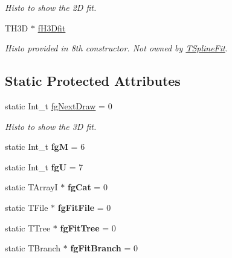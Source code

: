 \begin{DoxyCompactItemize}
\begin{DoxyCompactList}\small\item\em Histo to show the 2\-D fit. \end{DoxyCompactList}\item 
\hypertarget{classTSplineFit_a2c1b604dda9cf4250aa0e285be32dc08}{T\-H3\-D $\ast$ \hyperlink{classTSplineFit_a2c1b604dda9cf4250aa0e285be32dc08}{f\-H3\-Dfit}}\label{classTSplineFit_a2c1b604dda9cf4250aa0e285be32dc08}

\begin{DoxyCompactList}\small\item\em Histo provided in 8th constructor. Not owned by \hyperlink{classTSplineFit}{T\-Spline\-Fit}. \end{DoxyCompactList}\end{DoxyCompactItemize}
\subsection*{Static Protected Attributes}
\begin{DoxyCompactItemize}
\item 
\hypertarget{classTSplineFit_ae2d9de3b3b77b2987163ff3509f6e538}{static Int\-\_\-t \hyperlink{classTSplineFit_ae2d9de3b3b77b2987163ff3509f6e538}{fg\-Next\-Draw} = 0}\label{classTSplineFit_ae2d9de3b3b77b2987163ff3509f6e538}

\begin{DoxyCompactList}\small\item\em Histo to show the 3\-D fit. \end{DoxyCompactList}\item 
\hypertarget{classTSplineFit_a9d5ec2d6f377523e0aa70ac4e7de3298}{static Int\-\_\-t {\bfseries fg\-M} = 6}\label{classTSplineFit_a9d5ec2d6f377523e0aa70ac4e7de3298}

\item 
\hypertarget{classTSplineFit_a1107612acb0badbb171ddd236edbc5d2}{static Int\-\_\-t {\bfseries fg\-U} = 7}\label{classTSplineFit_a1107612acb0badbb171ddd236edbc5d2}

\item 
\hypertarget{classTSplineFit_a1a572a629004cfa802ed8713ade7422d}{static T\-Array\-I $\ast$ {\bfseries fg\-Cat} = 0}\label{classTSplineFit_a1a572a629004cfa802ed8713ade7422d}

\item 
\hypertarget{classTSplineFit_a663befdd68f895ca01acd08403aced71}{static T\-File $\ast$ {\bfseries fg\-Fit\-File} = 0}\label{classTSplineFit_a663befdd68f895ca01acd08403aced71}

\item 
\hypertarget{classTSplineFit_aeec11e5f9803681a38d01ac59666a8c7}{static T\-Tree $\ast$ {\bfseries fg\-Fit\-Tree} = 0}\label{classTSplineFit_aeec11e5f9803681a38d01ac59666a8c7}

\item 
\hypertarget{classTSplineFit_a2d6ef8fa049c35f1ff919b1e4d78f73e}{static T\-Branch $\ast$ {\bfseries fg\-Fit\-Branch} = 0}\label{classTSplineFit_a2d6ef8fa049c35f1ff919b1e4d78f73e}

\end{DoxyCompactItemize}


